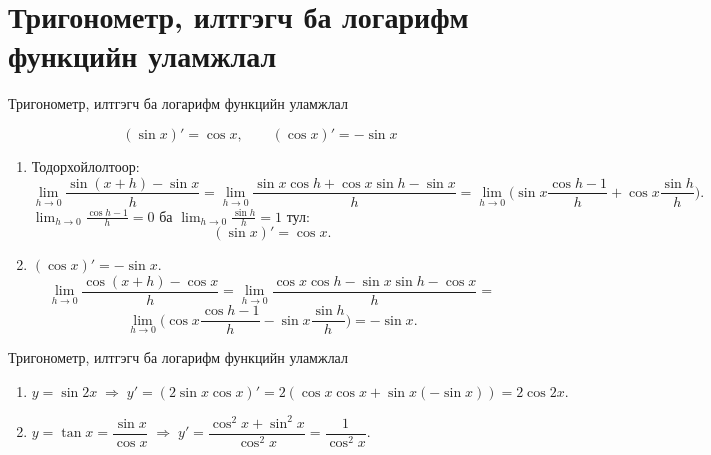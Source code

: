 \section{Тригонометр, илтгэгч ба логарифм функцийн уламжлал}
\begin{frame}[allowframebreaks]{Тригонометр, илтгэгч ба логарифм функцийн уламжлал}
\begin{theorem}
\[
(\sin x)' = \cos x, \qquad (\cos x)' = -\sin x
\]
\end{theorem}
\begin{prof}
\begin{enumerate}
  \item  
  Тодорхойлолтоор:
  \[
  \lim_{h\to0}\frac{\sin(x+h)-\sin x}{h}
  =\lim_{h\to0}\frac{\sin x\cos h+\cos x\sin h-\sin x}{h}
  =\lim_{h\to0}\big(\sin x\frac{\cos h-1}{h}+\cos x\frac{\sin h}{h}\big).
  \]
  $\displaystyle \lim_{h\to0}\frac{\cos h-1}{h}=0$ ба $\displaystyle \lim_{h\to0}\frac{\sin h}{h}=1$ тул:
  \[
  (\sin x)'=\cos x.
  \]

  \item $(\cos x)'=-\sin x$.  
  $$
  \lim_{h\to0}\frac{\cos(x+h)-\cos x}{h}
  =\lim_{h\to0}\frac{\cos x\cos h-\sin x\sin h-\cos x}{h}
  =$$
  $$\lim_{h\to0}\big(\cos x\frac{\cos h-1}{h}-\sin x\frac{\sin h}{h}\big)
  =-\sin x.
  $$
\end{enumerate}
\end{prof}
\end{frame}

\begin{frame}[allowframebreaks]{Тригонометр, илтгэгч ба логарифм функцийн уламжлал}
\begin{example}
\begin{enumerate}
  \item $y=\sin 2x \;\Rightarrow\; y'=(2\sin x\cos x)'=2(\cos x\cos x+\sin x(-\sin x))=2\cos 2x.$
  \item $y=\tan x=\dfrac{\sin x}{\cos x} 
  \;\Rightarrow\; y'=\dfrac{\cos^2 x+\sin^2 x}{\cos^2 x}
  =\dfrac{1}{\cos^2 x}.$
\end{enumerate}
\end{example}

\begin{center}
\begin{fitbox}\end{fitbox}
\end{center}
\end{frame}

